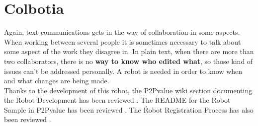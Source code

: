 \thispagestyle{sectioned}
\chapter{Colbotia}
\label{subsec:color_intro}
Again, text communications gets in the way of collaboration in some aspects. When working between several people it is sometimes necessary to talk about some aspect of the work they disagree in. In plain text, when there are more than two collaborators, there is no \textbf{way to know who edited what}, so those kind of issues can't be addressed personally. A robot is needed in order to know when and what changes are being made.\\[.2cm]
Thanks to the development of this robot, the P2Pvalue wiki section documenting the Robot Development has been reviewed \cite{ref:robot_development}. The README for the Robot Sample in P2Pvalue has been reviewed \cite{ref:readme_sample}. The Ŕobot Registration Process has also been reviewed \cite{ref:registration_process}.

